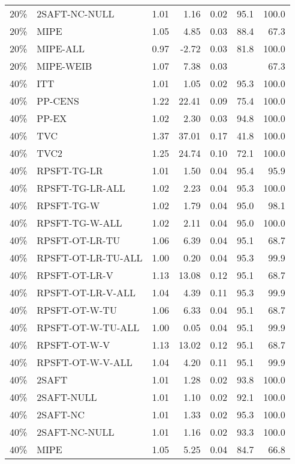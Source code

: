\begin{table}[ht]
{\begin{tabular}{llrrrrr}
  20\% & 2SAFT-NC-NULL & 1.01 & 1.16 & 0.02 & 95.1 & 100.0 \\ 
  20\% & MIPE & 1.05 & 4.85 & 0.03 & 88.4 & 67.3 \\ 
  20\% & MIPE-ALL & 0.97 & -2.72 & 0.03 & 81.8 & 100.0 \\ 
  20\% & MIPE-WEIB & 1.07 & 7.38 & 0.03 &  & 67.3 \\ 
   \hline
40\% & ITT & 1.01 & 1.05 & 0.02 & 95.3 & 100.0 \\ 
  40\% & PP-CENS & 1.22 & 22.41 & 0.09 & 75.4 & 100.0 \\ 
  40\% & PP-EX & 1.02 & 2.30 & 0.03 & 94.8 & 100.0 \\ 
  40\% & TVC & 1.37 & 37.01 & 0.17 & 41.8 & 100.0 \\ 
  40\% & TVC2 & 1.25 & 24.74 & 0.10 & 72.1 & 100.0 \\ 
   \hline
40\% & RPSFT-TG-LR & 1.01 & 1.50 & 0.04 & 95.4 & 95.9 \\ 
  40\% & RPSFT-TG-LR-ALL & 1.02 & 2.23 & 0.04 & 95.3 & 100.0 \\ 
  40\% & RPSFT-TG-W & 1.02 & 1.79 & 0.04 & 95.0 & 98.1 \\ 
  40\% & RPSFT-TG-W-ALL & 1.02 & 2.11 & 0.04 & 95.0 & 100.0 \\ 
  40\% & RPSFT-OT-LR-TU & 1.06 & 6.39 & 0.04 & 95.1 & 68.7 \\ 
  40\% & RPSFT-OT-LR-TU-ALL & 1.00 & 0.20 & 0.04 & 95.3 & 99.9 \\ 
  40\% & RPSFT-OT-LR-V & 1.13 & 13.08 & 0.12 & 95.1 & 68.7 \\ 
  40\% & RPSFT-OT-LR-V-ALL & 1.04 & 4.39 & 0.11 & 95.3 & 99.9 \\ 
   \hline
40\% & RPSFT-OT-W-TU & 1.06 & 6.33 & 0.04 & 95.1 & 68.7 \\ 
  40\% & RPSFT-OT-W-TU-ALL & 1.00 & 0.05 & 0.04 & 95.1 & 99.9 \\ 
  40\% & RPSFT-OT-W-V & 1.13 & 13.02 & 0.12 & 95.1 & 68.7 \\ 
  40\% & RPSFT-OT-W-V-ALL & 1.04 & 4.20 & 0.11 & 95.1 & 99.9 \\ 
   \hline
40\% & 2SAFT & 1.01 & 1.28 & 0.02 & 93.8 & 100.0 \\ 
  40\% & 2SAFT-NULL & 1.01 & 1.10 & 0.02 & 92.1 & 100.0 \\ 
  40\% & 2SAFT-NC & 1.01 & 1.33 & 0.02 & 95.3 & 100.0 \\ 
  40\% & 2SAFT-NC-NULL & 1.01 & 1.16 & 0.02 & 93.3 & 100.0 \\ 
  40\% & MIPE & 1.05 & 5.25 & 0.04 & 84.7 & 66.8 \\ 

\end{tabular}}
\end{table}
